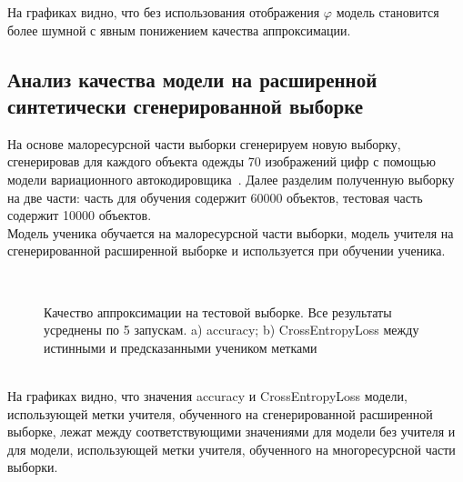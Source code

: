 На графиках видно, что без использования отображения $\varphi$ модель становится более шумной с явным понижением качества аппроксимации.

\newpage
\subsection{Анализ качества модели на расширенной синтетически сгенерированной выборке}
На основе малоресурсной части выборки сгенерируем новую выборку, сгенерировав для каждого объекта одежды 70 изображений цифр с помощью модели вариационного автокодировщика~\cite{VAE}. Далее разделим полученную выборку на две части: часть для обучения содержит 60000 объектов, тестовая часть содержит 10000 объектов.\\
Модель ученика обучается на малоресурсной части выборки, модель учителя на сгенерированной расширенной выборке и используется при обучении ученика.

\begin{figure}[h!t]\center
{}
\\
\caption{Качество аппроксимации на тестовой выборке. Все результаты усреднены по 5 запускам. a) accuracy; b) CrossEntropyLoss между истинными и предсказанными учеником метками}
\end{figure}\\

На графиках видно, что значения accuracy и CrossEntropyLoss модели, использующей метки учителя, обученного на сгенерированной расширенной выборке, лежат между соответствующими значениями для модели без учителя и для модели, использующей метки учителя, обученного на многоресурсной части выборки.